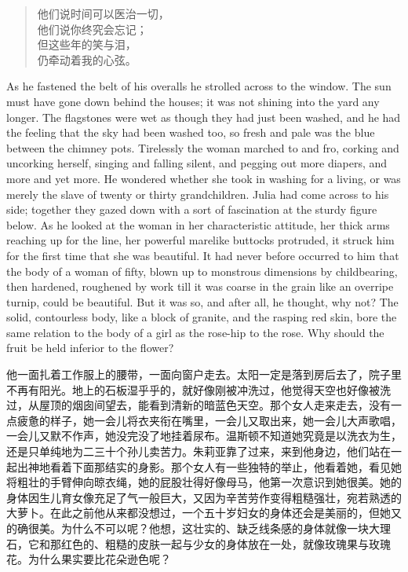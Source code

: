 \begin{paracol}{2}
\switchcolumn

\begin{quotation}
  \noindent
他们说时间可以医治一切，\\
他们说你终究会忘记；\\
但这些年的笑与泪，\\
仍牵动着我的心弦。
\end{quotation}

\switchcolumn*

As he fastened the belt of his overalls he strolled across to the
window. The sun must have gone down behind the houses; it was not
shining into the yard any longer. The flagstones were wet as though they
had just been washed, and he had the feeling that the sky had been
washed too, so fresh and pale was the blue between the chimney pots.
Tirelessly the woman marched to and fro, corking and uncorking herself,
singing and falling silent, and pegging out more diapers, and more and
yet more. He wondered whether she took in washing for a living, or was
merely the slave of twenty or thirty grandchildren. Julia had come
across to his side; together they gazed down with a sort of fascination
at the sturdy figure below. As he looked at the woman in her
characteristic attitude, her thick arms reaching up for the line, her
powerful marelike buttocks protruded, it struck him for the first time
that she was beautiful. It had never before occurred to him that the
body of a woman of fifty, blown up to monstrous dimensions by
childbearing, then hardened, roughened by work till it was coarse in the
grain like an overripe turnip, could be beautiful. But it was so, and
after all, he thought, why not? The solid, contourless body, like a
block of granite, and the rasping red skin, bore the same relation to
the body of a girl as the rose-hip to the rose. Why should the fruit be
held inferior to the flower?

\switchcolumn

他一面扎着工作服上的腰带，一面向窗户走去。太阳一定是落到房后去了，院子里不再有阳光。地上的石板湿乎乎的，就好像刚被冲洗过，他觉得天空也好像被洗过，从屋顶的烟囱间望去，能看到清新的暗蓝色天空。那个女人走来走去，没有一点疲惫的样子，她一会儿将衣夹衔在嘴里，一会儿又取出来，她一会儿大声歌唱，一会儿又默不作声，她没完没了地挂着尿布。温斯顿不知道她究竟是以洗衣为生，还是只单纯地为二三十个孙儿卖苦力。朱莉亚靠了过来，来到他身边，他们站在一起出神地看着下面那结实的身影。那个女人有一些独特的举止，他看着她，看见她将粗壮的手臂伸向晾衣绳，她的屁股壮得好像母马，他第一次意识到她很美。她的身体因生儿育女像充足了气一般巨大，又因为辛苦劳作变得粗糙强壮，宛若熟透的大萝卜。在此之前他从来都没想过，一个五十岁妇女的身体还会是美丽的，但她又的确很美。为什么不可以呢？他想，这壮实的、缺乏线条感的身体就像一块大理石，它和那红色的、粗糙的皮肤一起与少女的身体放在一处，就像玫瑰果与玫瑰花。为什么果实要比花朵逊色呢？


\end{paracol}
